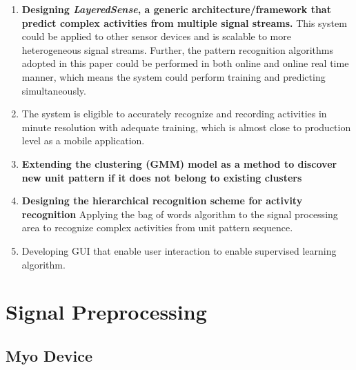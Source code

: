 \documentclass[a4paper, 10pt, conference]{IEEEtran}      %
\begin{document}
\begin{enumerate}

\item \textbf{Designing \emph{LayeredSense}, a generic architecture/framework that predict complex activities from multiple signal streams.} This system could be applied to other sensor devices and is scalable to more heterogeneous signal streams. Further, the pattern recognition algorithms adopted in this paper could be performed in both online and online real time manner, which means the system could perform training and predicting simultaneously. 

\item The system is eligible to accurately recognize and recording activities in minute resolution with adequate training, which is almost close to production level as a mobile application.

\item \textbf{Extending the clustering (GMM) model as a method to discover new unit pattern if it does not belong to existing clusters}

\item \textbf{Designing the hierarchical recognition scheme for activity recognition} Applying the bag of words algorithm to the signal processing area to recognize complex activities from unit pattern sequence.
\item Developing GUI that enable user interaction to enable supervised learning algorithm.


\end {enumerate}
   


\section{Signal Preprocessing}

\subsection{Myo Device}
\end{document}
